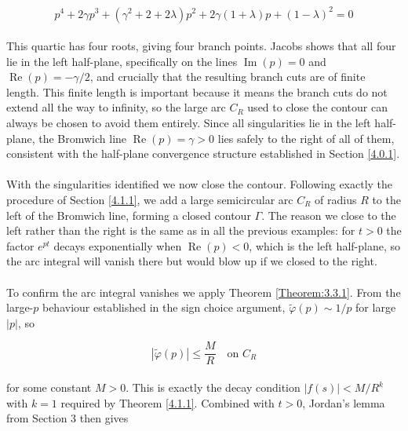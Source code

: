 \begin{equation}
    p^4 + 2\gamma p^3 + (\gamma^2 + 2 + 2\lambda)p^2 + 
    2\gamma(1+\lambda)p + (1-\lambda)^2 = 0
\end{equation}
\\
This quartic has four roots, giving four branch points. Jacobs shows that all four 
lie in the left half-plane, specifically on the lines $\operatorname{Im}(p) = 0$ 
and $\operatorname{Re}(p) = -\gamma/2$, and crucially that the resulting branch 
cuts are of finite length. This finite length is important because it 
means the branch cuts do not extend all the way to infinity, so the large arc 
$C_R$ used to close the contour can always be chosen to avoid them entirely. 
Since all singularities lie in the left half-plane, the Bromwich line 
$\operatorname{Re}(p) = \gamma > 0$ lies safely to the right of all of them, 
consistent with the half-plane convergence structure established in Section \ref{4.0.1}.
\\
\\
With the singularities identified we now close the contour. Following exactly the 
procedure of Section \ref{4.1.1}, we add a large semicircular arc $C_R$ of radius $R$ 
to the left of the Bromwich line, forming a closed contour $\Gamma$. The reason 
we close to the left rather than the right is the same as in all the previous 
examples: for $t > 0$ the factor $e^{pt}$ decays exponentially when 
$\operatorname{Re}(p) < 0$, which is the left half-plane, so the arc integral 
will vanish there but would blow up if we closed to the right.
\\
\\
To confirm the arc integral vanishes we apply Theorem \ref{Theorem:3.3.1}. From the large-$p$ 
behaviour established in the sign choice argument, $\tilde{\varphi}(p) \sim 1/p$ 
for large $|p|$, so

\begin{equation}
    \left|\tilde{\varphi}(p)\right| \leq \frac{M}{R} \quad \text{on } C_R
\end{equation}
\\
for some constant $M > 0$. This is exactly the decay condition $|f(s)| < M/R^k$ 
with $k = 1$ required by Theorem \ref{4.1.1}. Combined with $t > 0$, Jordan's lemma 
from Section 3 then gives

